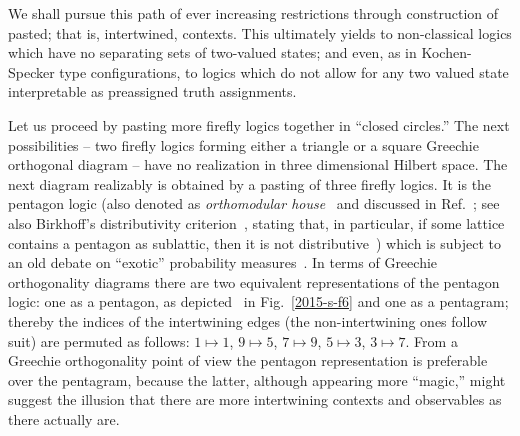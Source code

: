 


We shall pursue this path of ever increasing restrictions through construction of pasted; that is, intertwined, contexts.
This ultimately
yields to non-classical logics which have no separating sets of two-valued states; and even, as
in Kochen-Specker type configurations,
to logics which do not allow for any two valued state interpretable as preassigned truth assignments.


Let us proceed by pasting more firefly logics together in ``closed circles.'' The next possibilities -- two firefly logics forming either a triangle or a square Greechie orthogonal
diagram -- have no realization in three dimensional Hilbert space.
The next diagram realizably is obtained by a pasting of three firefly logics.
It is the pentagon logic (also denoted as {\em orthomodular house}~\cite[p.~46, Fig.~4.4]{kalmbach-83}
and discussed in Ref.~\cite{Beltrametti-1995};
see also Birkhoff's distributivity criterion~\cite[p.~90, Theorem~33]{beran},
stating that, in particular,  if some lattice contains a pentagon as sublattic,
then it is not distributive~\cite{birkhoff_1934})
which is subject to an old debate on ``exotic'' probability measures~\cite{wright:pent}.
In terms of Greechie orthogonality diagrams  there are two
equivalent representations of the  pentagon logic: one as a pentagon, as depicted~\cite{svozil-2016-s} in  Fig.~\ref{2015-s-f6}
and one as a pentagram; thereby the indices of the intertwining edges
(the non-intertwining ones follow suit) are permuted as follows:
$1 \mapsto 1$,
$9 \mapsto 5$,
$7 \mapsto 9$,
$5 \mapsto 3$,
$3 \mapsto 7$.
From a Greechie orthogonality point of view the pentagon representation is preferable over the pentagram,
because the latter, although appearing more ``magic,''  might suggest the illusion that there are more intertwining contexts and observables as there actually are.
